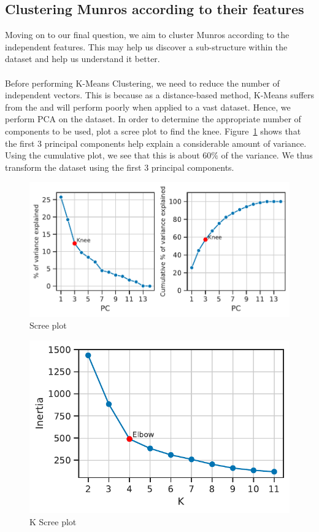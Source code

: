 \documentclass[11pt,a4paper]{article}
\begin{document}
\subsection{Clustering Munros according to their features}
Moving on to our final question, we aim to cluster Munros according to the independent features. This may help us discover a sub-structure within the dataset and help us understand it better. \\ \\
Before performing K-Means Clustering, we need to reduce the number of independent vectors. This is because as a distance-based method, K-Means suffers from the  and will perform poorly when applied to a vast dataset. Hence, we perform PCA on the dataset. In order to determine the appropriate number of components to be used, plot a scree plot to find the knee. Figure~\ref{fds-project-template:fig:scree_plot} shows that the first 3 principal components help explain a considerable amount of variance. Using the cumulative plot, we see that this is about $60\%$ of the variance. We thus transform the dataset using the first 3 principal components.
\begin{figure} [h!]
  \centering
  \includegraphics{report/scree_plot.pdf}
  \caption{Scree plot}
  \label{fds-project-template:fig:scree_plot}
\end{figure}
\begin{figure} [h!]
  \centering
  \includegraphics{report/k_screeplot.pdf}
  \caption{K Scree plot}
  \label{fds-project-template:fig:k_screeplot}
\end{figure} \\ \\
\end{document}
